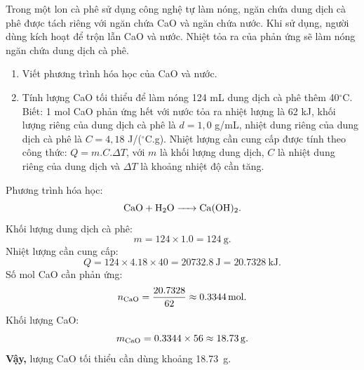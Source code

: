 \begin{tuluyen}
Trong một lon cà phê sử dụng công nghệ tự làm nóng, ngăn chứa dung dịch cà phê được tách riêng với ngăn chứa CaO và ngăn chứa nước. Khi sử dụng, người dùng kích hoạt để trộn lẫn CaO và nước. Nhiệt tỏa ra của phản ứng sẽ làm nóng ngăn chứa dung dịch cà phê.

\begin{enumerate}
\item Viết phương trình hóa học của CaO và nước.
\item Tính lượng CaO tối thiểu để làm nóng 124 mL dung dịch cà phê thêm 40$^\circ$C. Biết: 1 mol CaO phản ứng hết với nước tỏa ra nhiệt lượng là 62 kJ, khối lượng riêng của dung dịch cà phê là $d=1,0$ g/mL, nhiệt dung riêng của dung dịch cà phê là $C=4,18$ J/($^\circ$C.g). Nhiệt lượng cần cung cấp được tính theo công thức: $Q=m.C.\Delta T$, với $m$ là khối lượng dung dịch, $C$ là nhiệt dung riêng của dung dịch và $\Delta T$ là khoảng nhiệt độ cần tăng.
\end{enumerate}
\begin{loigiaiBT}
Phương trình hóa học:
\[
\ce{CaO + H2O -> Ca(OH)2}.
\]
Khối lượng dung dịch cà phê:
\[
m=124\times1.0=\SI{124}{\gram}.
\]
Nhiệt lượng cần cung cấp:
\[
Q=124\times4.18\times40=\SI{20732.8}{\joule}=\SI{20.7328}{\kilo\joule}.
\]
Số mol CaO cần phản ứng:
\[
n_{\ce{CaO}}=\frac{20.7328}{62}\approx\SI{0.3344}{\mole}.
\]
Khối lượng CaO:
\[
m_{\ce{CaO}}=0.3344\times56\approx\SI{18.73}{\gram}.
\]
\textbf{Vậy,} lượng CaO tối thiểu cần dùng khoảng \SI{18.73}{\gram}.
\end{loigiaiBT}
\end{tuluyen}
